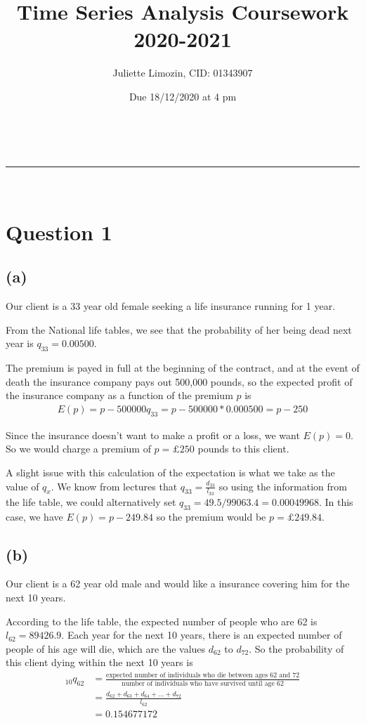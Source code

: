 \documentclass[a4paper,11pt]{article}
\makeatletter
\newcommand{\linia}{\rule{\linewidth}{0.5pt}}
\theoremstyle{mytheor}
\renewcommand{\maketitle}{
\begin{center}
\vspace{2ex}
{\huge \textsc{\@title}}
\vspace{1ex}
\\
\linia\\
\@author \hfill \@date
\vspace{1ex}
\end{center}
}
\makeatother
\begin{document}
\title{Time Series Analysis Coursework 2020-2021}

\author{Juliette Limozin, CID: 01343907}

\date{Due 18/12/2020 at 4 pm}

\maketitle

\section*{Question 1}
\subsection*{(a)}
Our client is a 33 year old female seeking a life insurance running for 1 year. 

From the National life tables, we see that the probability of her being dead next year is $q_{33} = 0.00500$.

The premium is payed in full at the beginning of the contract, and at the event of death the insurance company pays out 500,000 pounds, so the expected profit of the insurance company as a function of the premium $p$ is 
\begin{align*}
    E(p) = p - 500000q_{33} = p- 500000*0.000500 = p - 250
\end{align*}

Since the insurance doesn't want to make a profit or a loss, we want $E(p) = 0$. So we would charge a premium of $p = £ 250$ pounds to this client.

A slight issue with this calculation of the expectation is what we take as the value of $q_x$. We know from lectures that $q_{33} = \frac{d_{33}}{l_{33}}$ so using the information from the life table, we could alternatively set $q_{33} = 49.5/99063.4 = 0.00049968$. In this case, we have $E(p) = p - 249.84$ so the premium would be $p = £ 249.84$.

\subsection*{(b)}

Our client is a 62 year old male and would like a insurance covering him for the next 10 years.

According to the life table, the expected number of people who are 62 is $l_{62} = 89426.9$. Each year for the next 10 years, there is an expected number of people of his age will die, which are the values $d_{62}$ to $d_{72}$. So the probability of this client dying within the next 10 years is
\begin{align*}
  _{10}q_{62} & = \frac{\text{expected number of individuals who die between ages 62 and 72}}{\text{number of individuals who have survived until age 62}} \\
  & = \frac{d_{62} + d_{63} + d_{64} + ... + d_{72}}{l_{62}} \\
  & = 0.154677172
\end{align*}
\end{document}
